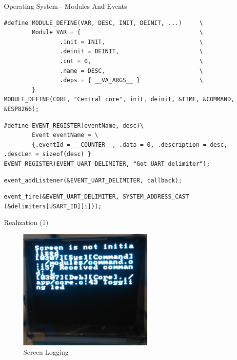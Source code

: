 \documentclass[apectratio=169]{beamer}
\begin{document}
\begin{frame}[fragile]{Operating System - Modules And Events}
\begin{verbatim}
#define MODULE_DEFINE(VAR, DESC, INIT, DEINIT, ...)     \
        Module VAR = {                                  \
                .init = INIT,                           \
                .deinit = DEINIT,                       \
                .cnt = 0,                               \
                .name = DESC,                           \
                .deps = { __VA_ARGS__ }                 \
        }
MODULE_DEFINE(CORE, "Central core", init, deinit, &TIME, &COMMAND, &ESP8266);
\end{verbatim}

\begin{verbatim}
#define EVENT_REGISTER(eventName, desc)\
        Event eventName = \
        {.eventId = __COUNTER__, .data = 0, .description = desc, .descLen = sizeof(desc) }
EVENT_REGISTER(EVENT_UART_DELIMITER, "Got UART delimiter");
\end{verbatim}

\begin{verbatim}
event_addListener(&EVENT_UART_DELIMITER, callback);
\end{verbatim}

\begin{verbatim}
event_fire(&EVENT_UART_DELIMITER, SYSTEM_ADDRESS_CAST (&delimiters[USART_ID][i]));
\end{verbatim}


\end{frame}	
  
	\begin{frame}{Realization (1)}
	\begin{figure}
        	\centering
                \includegraphics[width=0.6\textwidth]{./fig/screen_logger}
                \caption{Screen Logging}
        \end{figure}
	\end{frame}
\end{document}
